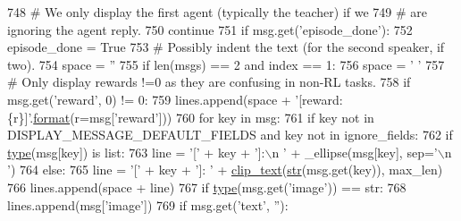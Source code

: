\begin{DoxyCode}
748             \textcolor{comment}{# We only display the first agent (typically the teacher) if we}
749             \textcolor{comment}{# are ignoring the agent reply.}
750             \textcolor{keywordflow}{continue}
751         \textcolor{keywordflow}{if} msg.get(\textcolor{stringliteral}{'episode\_done'}):
752             episode\_done = \textcolor{keyword}{True}
753         \textcolor{comment}{# Possibly indent the text (for the second speaker, if two).}
754         space = \textcolor{stringliteral}{''}
755         \textcolor{keywordflow}{if} len(msgs) == 2 \textcolor{keywordflow}{and} index == 1:
756             space = \textcolor{stringliteral}{'   '}
757         \textcolor{comment}{# Only display rewards !=0 as they are confusing in non-RL tasks.}
758         \textcolor{keywordflow}{if} msg.get(\textcolor{stringliteral}{'reward'}, 0) != 0:
759             lines.append(space + \textcolor{stringliteral}{'[reward: \{r\}]'}.\hyperlink{namespaceparlai_1_1chat__service_1_1services_1_1messenger_1_1shared__utils_a32e2e2022b824fbaf80c747160b52a76}{format}(r=msg[\textcolor{stringliteral}{'reward'}]))
760         \textcolor{keywordflow}{for} key \textcolor{keywordflow}{in} msg:
761             \textcolor{keywordflow}{if} key \textcolor{keywordflow}{not} \textcolor{keywordflow}{in} DISPLAY\_MESSAGE\_DEFAULT\_FIELDS \textcolor{keywordflow}{and} key \textcolor{keywordflow}{not} \textcolor{keywordflow}{in} ignore\_fields:
762                 \textcolor{keywordflow}{if} \hyperlink{namespaceparlai_1_1agents_1_1tfidf__retriever_1_1build__tfidf_ad5dfae268e23f506da084a9efb72f619}{type}(msg[key]) \textcolor{keywordflow}{is} list:
763                     line = \textcolor{stringliteral}{'['} + key + \textcolor{stringliteral}{']:\(\backslash\)n  '} + \_ellipse(msg[key], sep=\textcolor{stringliteral}{'\(\backslash\)n  '})
764                 \textcolor{keywordflow}{else}:
765                     line = \textcolor{stringliteral}{'['} + key + \textcolor{stringliteral}{']: '} + \hyperlink{namespaceparlai_1_1utils_1_1misc_a219b248f4399036a381ca859aa97433e}{clip\_text}(\hyperlink{namespacegenerate__task__READMEs_a5b88452ffb87b78c8c85ececebafc09f}{str}(msg.get(key)), max\_len)
766                 lines.append(space + line)
767         \textcolor{keywordflow}{if} \hyperlink{namespaceparlai_1_1agents_1_1tfidf__retriever_1_1build__tfidf_ad5dfae268e23f506da084a9efb72f619}{type}(msg.get(\textcolor{stringliteral}{'image'})) == str:
768             lines.append(msg[\textcolor{stringliteral}{'image'}])
769         \textcolor{keywordflow}{if} msg.get(\textcolor{stringliteral}{'text'}, \textcolor{stringliteral}{''}):

\end{DoxyCode}
